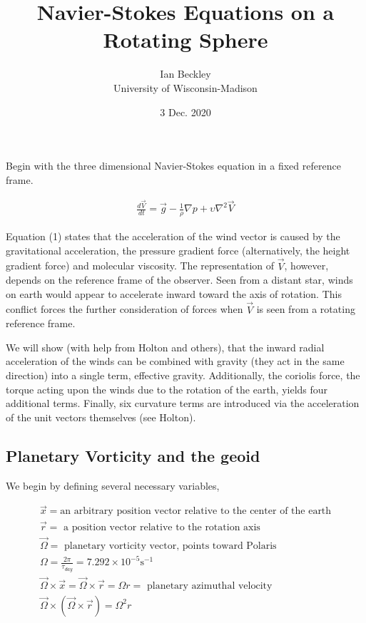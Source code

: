 \documentclass[a4paper,12pt]{article}
\begin{document}
\title{\vspace{-4.0cm}Navier-Stokes Equations on a Rotating Sphere}
\author{Ian Beckley
\\University of Wisconsin-Madison}

\date{3 Dec. 2020}

\maketitle
Begin with the three dimensional Navier-Stokes equation in a fixed reference frame.

\begin{align}
\frac{d \vec V}{dt} = \vec g - \frac{1}{\rho}\nabla p + \upsilon \nabla^2 \vec V
\end{align}

Equation (1) states that the acceleration of the wind vector is caused by the gravitational acceleration, the pressure gradient force (alternatively, the height gradient force) and molecular viscosity. The representation of $\vec V$, however, depends on the reference frame of the observer. Seen from a distant star, winds on earth would appear to accelerate inward toward the axis of rotation. This conflict forces the further consideration of forces when $\vec V$ is seen from a rotating reference frame. 

We will show (with help from Holton and others), that the inward radial acceleration of the winds can be combined with gravity (they act in the same direction) into a single term, effective gravity. Additionally, the coriolis force, the torque acting upon the winds due to the rotation of the earth, yields four additional terms. Finally, six curvature terms are introduced via the acceleration of the unit vectors themselves (see Holton).

\subsection*{Planetary Vorticity and the geoid}

We begin by defining several necessary variables,

\begin{align*}
\vec x = \text{an arbitrary position vector relative to the center of the earth}\\
\vec r = \text{ a position vector relative to the rotation axis}\\
\vec \Omega = \text{ planetary vorticity vector, points toward Polaris}\\
\Omega = \frac{2\pi}{\tau_{day}} = 7.292 \times 10^{-5} \text{s}^{-1}\\
\vec \Omega \times \vec x = \vec \Omega \times \vec r = \Omega r = \text{ planetary azimuthal velocity}\\
\vec \Omega \times (\vec \Omega \times \vec r) = \Omega^{2} r
\end{align*}
\end{document}
